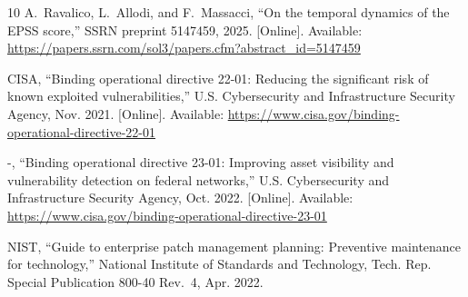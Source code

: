 \documentclass[journal]{IEEEtran}
\begin{document}
\begin{thebibliography}{10}
\BIBentryALTinterwordspacing
A.~Ravalico, L.~Allodi, and F.~Massacci, ``On the temporal dynamics of the
  {EPSS} score,'' SSRN preprint 5147459, 2025. [Online]. Available:
  \url{https://papers.ssrn.com/sol3/papers.cfm?abstract_id=5147459}
\BIBentrySTDinterwordspacing

\BIBentryALTinterwordspacing
{CISA}, ``Binding operational directive 22-01: Reducing the significant risk of
  known exploited vulnerabilities,'' U.S. Cybersecurity and Infrastructure
  Security Agency, Nov. 2021. [Online]. Available:
  \url{https://www.cisa.gov/binding-operational-directive-22-01}
\BIBentrySTDinterwordspacing

\BIBentryALTinterwordspacing
-, ``Binding operational directive 23-01: Improving asset visibility and
  vulnerability detection on federal networks,'' U.S. Cybersecurity and
  Infrastructure Security Agency, Oct. 2022. [Online]. Available:
  \url{https://www.cisa.gov/binding-operational-directive-23-01}
\BIBentrySTDinterwordspacing

{NIST}, ``Guide to enterprise patch management planning: Preventive maintenance
  for technology,'' National Institute of Standards and Technology, Tech. Rep.
  Special Publication 800-40 Rev.~4, Apr. 2022.

\end{thebibliography}
\end{document}
